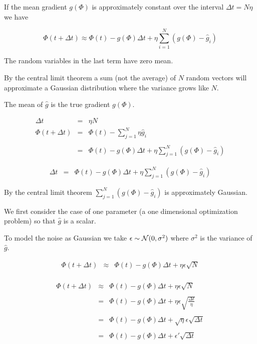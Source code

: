 {If the mean gradient $g(\Phi)$ is approximately constant over the interval $\Delta t = N \eta$ we have

$$\Phi(t + \Delta t)  \approx \Phi(t) -g(\Phi)\Delta t + \eta \sum_{i=1}^N (g(\Phi) - \hat{g}_i)$$

\vfill
The random variables in the last term have zero mean.

\vfill
By the central limit theorem a sum (not the average) of $N$ random vectors will approximate a Gaussian distribution where the variance
grows like $N$.


The mean of $\hat{g}$ is the true gradient $g(\Phi)$.  

\begin{eqnarray*}
\Delta t & = & \eta N \\
\Phi(t + \Delta t) &  = & \Phi(t) - \sum_{j=1}^N \eta\hat{g}_i \\
\\
 &  = & \Phi(t) -g(\Phi)\Delta t + \eta \sum_{j=1}^N (g(\Phi) - \hat{g}_i)
\end{eqnarray*}


\begin{eqnarray*}
\Delta t & = &  \Phi(t) -g(\Phi)\Delta t + \eta \sum_{j=1}^N (g(\Phi) - \hat{g}_i)
\end{eqnarray*}


\vfill
By the central limit theorem $\sum_{j=1}^N (g(\Phi) - \hat{g}_i)$ is approximately Gaussian.


We first consider the case of one parameter (a one dimensional optimization problem) so that $\hat{g}$ is a scalar.

\vfill
To model the noise as Gaussian we take $\epsilon \sim {\cal N}(0,\sigma^2)$ where $\sigma^2$ is the variance of $\hat{g}$.

\begin{eqnarray*}
\Phi(t + \Delta t) & \approx & \Phi(t) -g(\Phi)\Delta t + \eta \epsilon \sqrt{N} \\
\end{eqnarray*}


\begin{eqnarray*}
\Phi(t + \Delta t) & \approx & \Phi(t) -g(\Phi)\Delta t +  \eta \epsilon \sqrt{N} \\
\\
& = & \Phi(t) -g(\Phi)\Delta t +  \eta \epsilon \sqrt{\frac{\Delta t}{\eta}} \\
\\
& = & \Phi(t) -g(\Phi)\Delta t +  \sqrt{\eta} \epsilon \sqrt{\Delta t} \\
\\
& = & \Phi(t) -g(\Phi)\Delta t +  \epsilon' \sqrt{\Delta t} \\
\end{eqnarray*}

}
